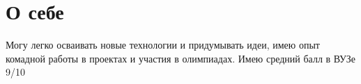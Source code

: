 \section{\textbf{О себе}}
\smallskip

\quad Могу легко осваивать новые технологии и придумывать идеи, имею опыт комадной работы в проектах и участия в олимпиадах.
Имею средний балл в ВУЗе 9/10
